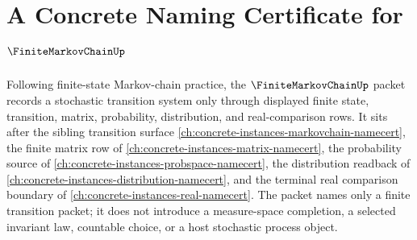 \chapter{A Concrete Naming Certificate for $\FiniteMarkovChainUp$}
\label{ch:concrete-instances-finite-markov-chain-namecert}

Following finite-state Markov-chain practice, the $\FiniteMarkovChainUp$
packet records a stochastic transition system only through displayed finite
state, transition, matrix, probability, distribution, and real-comparison rows.
It sits after the sibling transition surface
\autoref{ch:concrete-instances-markovchain-namecert}, the finite matrix row
of \autoref{ch:concrete-instances-matrix-namecert}, the probability source of
\autoref{ch:concrete-instances-probspace-namecert}, the distribution readback
of \autoref{ch:concrete-instances-distribution-namecert}, and the terminal
real comparison boundary of \autoref{ch:concrete-instances-real-namecert}. The
packet names only a finite transition packet; it does not introduce a
measure-space completion, a selected invariant law, countable choice, or a
host stochastic process object.

